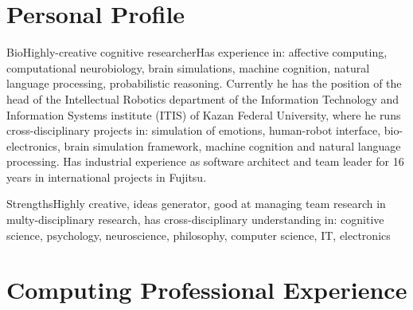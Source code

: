 \documentclass{moderncv}
\begin{document}
\makecvtitle

 
\section{Personal Profile}

\cventry
{Bio}{Highly-creative cognitive researcher}{}{}{}{Has experience in: affective computing, computational neurobiology, brain simulations, machine cognition, natural language processing, probabilistic reasoning. Currently he has the position of the head of the Intellectual Robotics department of the Information Technology and Information Systems institute (ITIS) of Kazan Federal University, where he runs cross-disciplinary projects in: simulation of emotions, human-robot interface, bio-electronics, brain simulation framework, machine cognition and natural language processing. Has industrial experience as software architect and team leader for 16 years in international projects in Fujitsu.}

\cvitem
{Strengths}{Highly creative, ideas generator, good at managing team research in multy-disciplinary research, has cross-disciplinary understanding in: cognitive science, psychology, neuroscience, philosophy, computer science, IT, electronics}

\section{Computing Professional Experience}

\end{document}
